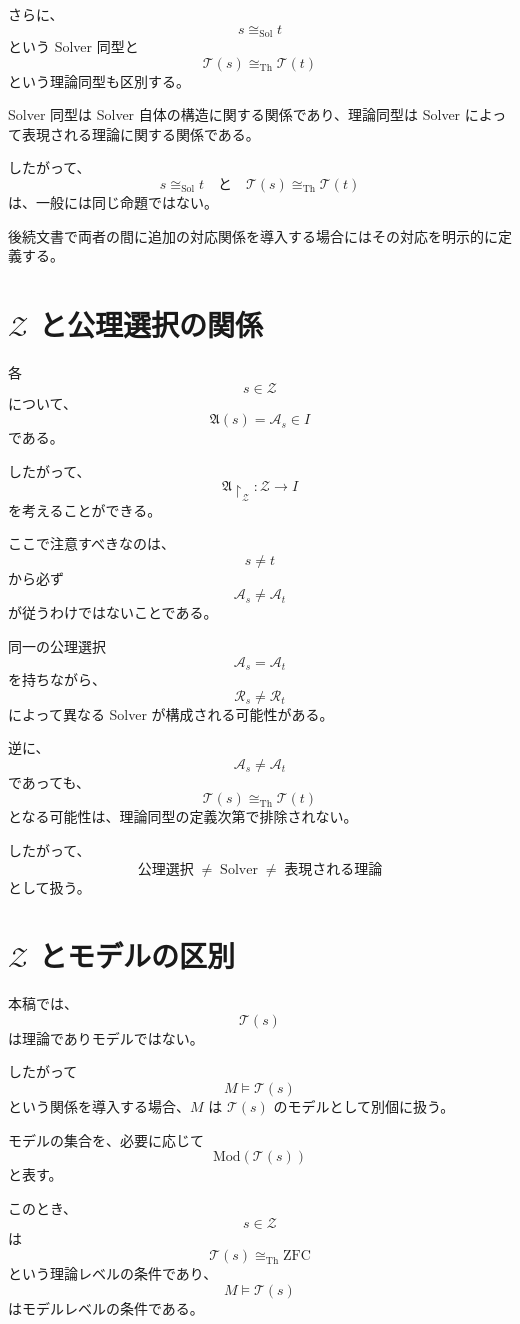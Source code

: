 \documentclass[a4paper,11pt]{jsarticle}
\begin{document}
さらに、
\[
s\cong_{\mathrm{Sol}}t
\]
という Solver 同型と
\[
\mathcal{T}(s)\cong_{\mathrm{Th}}\mathcal{T}(t)
\]
という理論同型も区別する。

Solver 同型は Solver 自体の構造に関する関係であり、理論同型は Solver によって表現される理論に関する関係である。

したがって、
\[
\boxed{
s\cong_{\mathrm{Sol}}t
\quad\text{と}\quad
\mathcal{T}(s)\cong_{\mathrm{Th}}\mathcal{T}(t)
}
\]
は、一般には同じ命題ではない。

後続文書で両者の間に追加の対応関係を導入する場合にはその対応を明示的に定義する。

\section{$\mathcal{Z}$ と公理選択の関係}

各
\[
s\in\mathcal{Z}
\]
について、
\[
\mathfrak{A}(s)=\mathcal{A}_s\in I
\]
である。

したがって、
\[
\mathfrak{A}\restriction_{\mathcal{Z}}
:
\mathcal{Z}\longrightarrow I
\]
を考えることができる。

ここで注意すべきなのは、
\[
s\neq t
\]
から必ず
\[
\mathcal{A}_s\neq\mathcal{A}_t
\]
が従うわけではないことである。

同一の公理選択
\[
\mathcal{A}_s=\mathcal{A}_t
\]
を持ちながら、
\[
\mathcal{R}_s\neq\mathcal{R}_t
\]
によって異なる Solver が構成される可能性がある。

逆に、
\[
\mathcal{A}_s\neq\mathcal{A}_t
\]
であっても、
\[
\mathcal{T}(s)\cong_{\mathrm{Th}}\mathcal{T}(t)
\]
となる可能性は、理論同型の定義次第で排除されない。

したがって、
\[
\boxed{
\text{公理選択}
\;\neq\;
\text{Solver}
\;\neq\;
\text{表現される理論}
}
\]
として扱う。

\section{$\mathcal{Z}$ とモデルの区別}

本稿では、
\[
\mathcal{T}(s)
\]
は理論でありモデルではない。

したがって
\[
M\models\mathcal{T}(s)
\]
という関係を導入する場合、$M$ は
$\mathcal{T}(s)$ のモデルとして別個に扱う。

モデルの集合を、必要に応じて
\[
\boxed{
\mathrm{Mod}(\mathcal{T}(s))
}
\]
と表す。

このとき、
\[
s\in\mathcal{Z}
\]
は
\[
\mathcal{T}(s)\cong_{\mathrm{Th}}\mathrm{ZFC}
\]
という理論レベルの条件であり、
\[
M\models\mathcal{T}(s)
\]
はモデルレベルの条件である。
\end{document}
